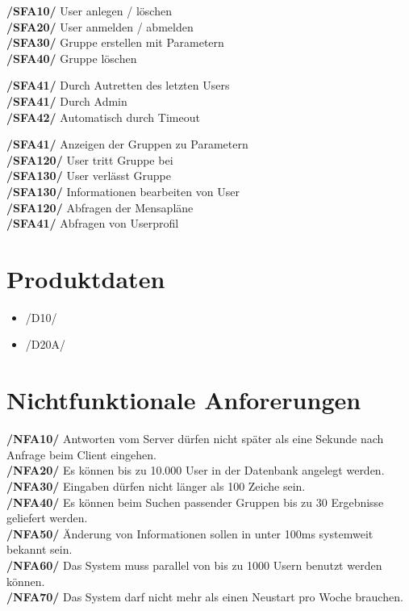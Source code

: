 \documentclass[a4paper]{scrreprt}
\begin{document}
\begin{addmargin}[25pt]{0pt} 
\textbf{/SFA10/} User anlegen / löschen\\
\textbf{/SFA20/} User anmelden / abmelden\\
\textbf{/SFA30/} Gruppe erstellen mit Parametern\\
\textbf{/SFA40/} Gruppe löschen\\
	\begin{addmargin}[25pt]{0pt} 
	\textbf{/SFA41/} Durch Autretten des letzten Users\\
	\textbf{/SFA41/} Durch Admin\\
	\textbf{/SFA42/} Automatisch durch Timeout\\
	\end{addmargin}
\textbf{/SFA41/} Anzeigen der Gruppen zu Parametern\\
\textbf{/SFA120/} User tritt Gruppe bei\\
\textbf{/SFA130/} User verlässt Gruppe\\
\textbf{/SFA130/} Informationen bearbeiten von User\\
\textbf{/SFA120/} Abfragen der Mensapläne\\
\textbf{/SFA41/} Abfragen von Userprofil\\
\end{addmargin}

\chapter{Produktdaten}
\begin{itemize}
\item /D10/ 
\item /D20A/
\end{itemize}

\chapter{Nichtfunktionale Anforerungen}

\begin{addmargin}[25pt]{0pt} 
\textbf{/NFA10/} Antworten vom Server dürfen nicht später als eine Sekunde nach Anfrage beim Client eingehen.\\
\textbf{/NFA20/} Es können bis zu 10.000 User in der Datenbank angelegt werden.\\
\textbf{/NFA30/} Eingaben dürfen nicht länger als 100 Zeiche sein.\\
\textbf{/NFA40/} Es können beim Suchen passender Gruppen bis zu 30 Ergebnisse geliefert werden.\\
\textbf{/NFA50/} Änderung von Informationen sollen in unter 100ms systemweit bekannt sein.\\
\textbf{/NFA60/} Das System muss parallel von bis zu 1000 Usern benutzt werden können.\\
\textbf{/NFA70/} Das System darf nicht mehr als einen Neustart pro Woche brauchen.\\
\end{addmargin}
\end{document}

